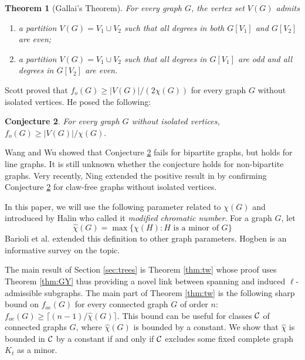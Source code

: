\documentclass{article}
\newcommand{\mchi}{\hat{\chi}}
\newcommand{\2}{\vspace{0.2cm}}
\newtheorem{theorem}{Theorem}[section]
\newtheorem{conjecture}[theorem]{Conjecture}
\begin{document}
\begin{theorem}[Gallai's Theorem]\label{thm: gallai thm}
For every graph $G$, the vertex set $V(G)$ admits
\begin{enumerate}
    \item a partition $V(G)=V_1\cup V_2$ such that all degrees in both $G[V_1]$ and $G[V_2]$ are even;
    \item a partition $V(G)=V_1\cup V_2$ such that all degrees in $G[V_1]$ are odd and all degrees in $G[V_2]$ are even.
\end{enumerate}
\end{theorem}

\medskip


Scott \cite{Scott1992} proved that $f_o(G)\ge |V(G)|/(2\chi(G))$ for every graph $G$ without isolated vertices. He posed the following:
\begin{conjecture}\label{conj:scott}
For every graph $G$ without isolated vertices, $f_o(G)\ge |V(G)|/\chi(G).$   
\end{conjecture}
Wang and Wu \cite{WW} showed that Conjecture \ref{conj:scott} fails for bipartite graphs, but holds for line graphs. It is still unknown whether the conjecture holds for 
non-bipartite graphs.
Very recently, Ning \cite{Ning} extended the positive result in \cite{WW} by confirming Conjecture \ref{conj:scott} for claw-free graphs without isolated vertices. 

In this paper, we will use the following parameter related to $\chi(G)$ and introduced by Halin \cite{Halin} who called it {\em modified chromatic number}.
For a graph $G$, let
$$
  \mchi(G)=\max\{\chi(H): H \text{ is a minor of } G\}
$$
Barioli et al. \cite{Barioli+} extended this definition to other graph parameters. 
Hogben \cite{Hogben} is an informative survey on the topic. 


The main result of Section \ref{sec:trees} is Theorem \ref{thm:tw} whose proof uses Theorem \ref{thm:GY} thus providing a novel link between spanning and induced $\ell$-admissible subgraphs. The main part of Theorem \ref{thm:tw}
is the following sharp bound on $f_{oe}(G)$ for every connected graph $G$ of order $n$: $f_{oe}(G)\ge \lceil (n-1)/\mchi(G) \rceil$. 
This bound can be useful for classes $\cal C$ of connected graphs $G$, where $\mchi(G)$ is bounded by a constant. We show that $\mchi$ is bounded in $\cal C$ by a constant if and only if $\cal C$ excludes some fixed complete graph $K_t$ as a minor. 
\end{document}
